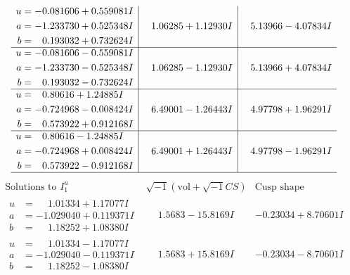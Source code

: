 \documentclass[1p]{elsarticle_modified}
\theoremstyle{definition}
\newcommand{\I}{\sqrt{-1}}
\begin{document}
$$\begin{array}{c|c|c}
\begin{aligned}
u &= -0.081606 + 0.559081 I \\
a &= -1.233730 + 0.525348 I \\
b &= \phantom{-}0.193032 + 0.732624 I\end{aligned}
 & \phantom{-}1.06285 + 1.12930 I & \phantom{-}5.13966 - 4.07834 I \\ \hline\begin{aligned}
u &= -0.081606 - 0.559081 I \\
a &= -1.233730 - 0.525348 I \\
b &= \phantom{-}0.193032 - 0.732624 I\end{aligned}
 & \phantom{-}1.06285 - 1.12930 I & \phantom{-}5.13966 + 4.07834 I \\ \hline\begin{aligned}
u &= \phantom{-}0.80616 + 1.24885 I \\
a &= -0.724968 - 0.008424 I \\
b &= \phantom{-}0.573922 + 0.912168 I\end{aligned}
 & \phantom{-}6.49001 - 1.26443 I & \phantom{-}4.97798 + 1.96291 I \\ \hline\begin{aligned}
u &= \phantom{-}0.80616 - 1.24885 I \\
a &= -0.724968 + 0.008424 I \\
b &= \phantom{-}0.573922 - 0.912168 I\end{aligned}
 & \phantom{-}6.49001 + 1.26443 I & \phantom{-}4.97798 - 1.96291 I\\
 \hline 
 \end{array}$$\newpage$$\begin{array}{c|c|c}  
\text{Solutions to }I^u_{1}& \I (\text{vol} + \sqrt{-1}CS) & \text{Cusp shape}\\
 \hline 
\begin{aligned}
u &= \phantom{-}1.01334 + 1.17077 I \\
a &= -1.029040 + 0.119371 I \\
b &= \phantom{-}1.18252 + 1.08380 I\end{aligned}
 & \phantom{-}1.5683 - 15.8169 I & -0.23034 + 8.70601 I \\ \hline\begin{aligned}
u &= \phantom{-}1.01334 - 1.17077 I \\
a &= -1.029040 - 0.119371 I \\
b &= \phantom{-}1.18252 - 1.08380 I\end{aligned}
 & \phantom{-}1.5683 + 15.8169 I & -0.23034 - 8.70601 I \\ \hline\begin{aligned}

\end{aligned}
\end{array}$$
\end{document}
